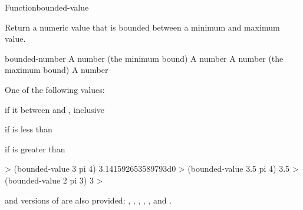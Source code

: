 \documentclass[10pt,twoside,english,pdftex]{article}
\begin{document}
\begin{functiondoc}{Function}{bounded-value}{
    }
%

\fnsyntax

\fnpurpose Return a numeric value that is bounded between a minimum
and maximum value.

\fnpackage {}

\fnmodule {}

\fnargs
\begin{args}{bounded-number}
\arg[min] A number (the minimum bound)
\arg[number] A number
\arg[max] A number (the maximum bound)
 A number
\end{args}

\fnreturns One of the following values:
\begin{tightitemize}
\item {} if it between  and , inclusive
\item {} if  is less than 
\item {} if  is greater than 
\end{tightitemize}

\fnexamples
\begin{example}
%
\W\supp
  > (bounded-value 3 pi 4)
  3.141592653589793d0
  > (bounded-value 3.5 pi 4)
  3.5
  > (bounded-value 2 pi 3)
  3
  >
\end{example}

\fnnote
%
%
%
%
%
%
%
%
 and  versions of  are also
provided: , ,
, ,
, and .

\end{functiondoc}

\end{document}
